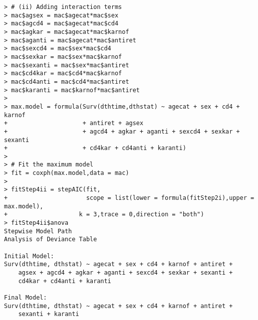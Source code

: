 \begin{enumerate}[(a)]
\begin{enumerate}[Step 1:]
\begin{enumerate}[(i)]
\begin{spacing}{1.2}
\begin{footnotesize}
\begin{verbatim}
> # (ii) Adding interaction terms
> mac$agsex = mac$agecat*mac$sex 
> mac$agcd4 = mac$agecat*mac$cd4 
> mac$agkar = mac$agecat*mac$karnof 
> mac$aganti = mac$agecat*mac$antiret 
> mac$sexcd4 = mac$sex*mac$cd4 
> mac$sexkar = mac$sex*mac$karnof 
> mac$sexanti = mac$sex*mac$antiret 
> mac$cd4kar = mac$cd4*mac$karnof 
> mac$cd4anti = mac$cd4*mac$antiret 
> mac$karanti = mac$karnof*mac$antiret
> 
> max.model = formula(Surv(dthtime,dthstat) ~ agecat + sex + cd4 + karnof 
+                     + antiret + agsex 
+                     + agcd4 + agkar + aganti + sexcd4 + sexkar + sexanti 
+                     + cd4kar + cd4anti + karanti)
> 
> # Fit the maximum model
> fit = coxph(max.model,data = mac)
> 
> fitStep4ii = stepAIC(fit,
+                      scope = list(lower = formula(fitStep2i),upper = max.model),
+                    k = 3,trace = 0,direction = "both")
> fitStep4ii$anova
Stepwise Model Path 
Analysis of Deviance Table

Initial Model:
Surv(dthtime, dthstat) ~ agecat + sex + cd4 + karnof + antiret + 
    agsex + agcd4 + agkar + aganti + sexcd4 + sexkar + sexanti + 
    cd4kar + cd4anti + karanti

Final Model:
Surv(dthtime, dthstat) ~ agecat + sex + cd4 + karnof + antiret + 
    sexanti + karanti



\end{verbatim}
\end{footnotesize}
\end{spacing}
\end{enumerate}
\end{enumerate}
\end{enumerate}
